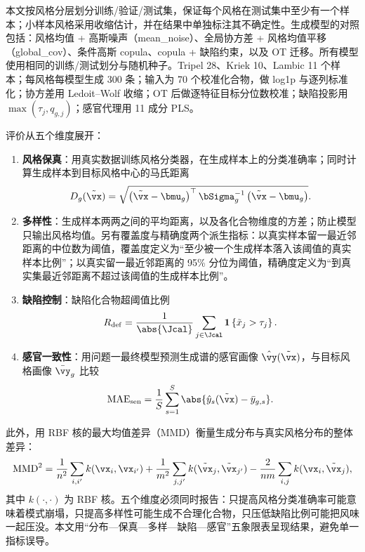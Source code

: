 本文按风格分层划分训练/验证/测试集，保证每个风格在测试集中至少有一个样本；小样本风格采用收缩估计，并在结果中单独标注其不确定性。生成模型的对照包括：风格均值 + 高斯噪声（mean\_noise）、全局协方差 + 风格均值平移（global\_cov）、条件高斯 copula、copula + 缺陷约束，以及 OT 迁移。所有模型使用相同的训练/测试划分与随机种子。Tripel 28、Kriek 10、Lambic 11 个样本；每风格每模型生成 300 条；输入为 70 个校准化合物，做 log1p 与逐列标准化；协方差用 Ledoit--Wolf 收缩；OT 后做逐特征目标分位数校准；缺陷投影用 $\max(\tau_j,q_{g,j})$；感官代理用 11 成分 PLS。

评价从五个维度展开：

\begin{enumerate}
  \item \textbf{风格保真}：用真实数据训练风格分类器，在生成样本上的分类准确率；同时计算生成样本到目标风格中心的马氏距离
  \begin{equation}
    D_g(\tilde{\vx})=\sqrt{\left(\tilde{\vx}-\bmu_g\right)^\top
    \bSigma_g^{-1}\left(\tilde{\vx}-\bmu_g\right)}.
    \label{eq:q3-mahalanobis}
  \end{equation}
  \item \textbf{多样性}：生成样本两两之间的平均距离，以及各化合物维度的方差；防止模型只输出风格均值。另有覆盖度与精确度两个派生指标：以真实样本留一最近邻距离的中位数为阈值，覆盖度定义为“至少被一个生成样本落入该阈值的真实样本比例”；以真实留一最近邻距离的 95\% 分位为阈值，精确度定义为“到真实集最近邻距离不超过该阈值的生成样本比例”。
  \item \textbf{缺陷控制}：缺陷化合物超阈值比例
  \begin{equation}
    R_{\mathrm{def}}=\frac{1}{\abs{\Jcal}}
    \sum_{j\in\Jcal}\mathbf{1}\left\{\tilde{x}_j>\tau_j\right\}.
    \label{eq:q3-defect-rate}
  \end{equation}
  \item \textbf{感官一致性}：用问题一最终模型预测生成谱的感官画像 $\hat{\vy}(\tilde{\vx})$，与目标风格画像 $\bar{\vy}_g$ 比较
  \begin{equation}
    \mathrm{MAE}_{\mathrm{sen}}=\frac{1}{S}\sum_{s=1}^{S}
    \abs{\hat{y}_s(\tilde{\vx})-\bar{y}_{g,s}}.
    \label{eq:q3-sensory}
  \end{equation}
\end{enumerate}

此外，用 RBF 核的最大均值差异（MMD）衡量生成分布与真实风格分布的整体差异：
\begin{equation}
  \mathrm{MMD}^2=
  \frac{1}{n^2}\sum_{i,i'}k(\vx_i,\vx_{i'})
  +\frac{1}{m^2}\sum_{j,j'}k(\tilde{\vx}_j,\tilde{\vx}_{j'})
  -\frac{2}{nm}\sum_{i,j}k(\vx_i,\tilde{\vx}_j),
  \label{eq:q3-mmd}
\end{equation}
其中 $k(\cdot,\cdot)$ 为 RBF 核。五个维度必须同时报告：只提高风格分类准确率可能意味着模式崩塌，只提高多样性可能生成不合理化合物，只压低缺陷比例可能把风味一起压没。本文用“分布—保真—多样—缺陷—感官”五象限表呈现结果，避免单一指标误导。

